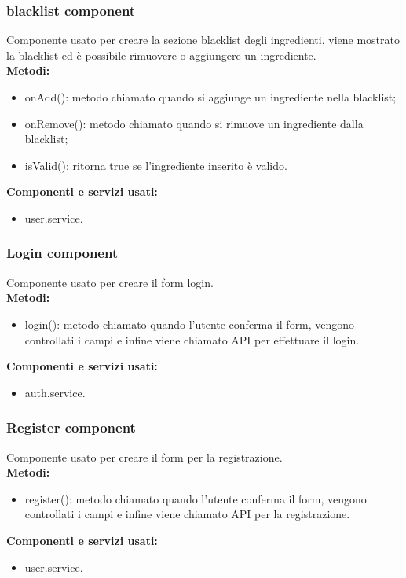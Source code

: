 \subsubsection{blacklist component}
Componente usato per creare la sezione blacklist degli ingredienti, viene mostrato la blacklist ed è possibile rimuovere o aggiungere un ingrediente.\\
\textbf{Metodi:}
\begin{itemize}
    \item onAdd(): metodo chiamato quando si aggiunge un ingrediente nella blacklist;
    \item onRemove(): metodo chiamato quando si rimuove un ingrediente dalla blacklist;
    \item isValid(): ritorna true se l'ingrediente inserito è valido.
\end{itemize}
\textbf{Componenti e servizi usati:}
\begin{itemize}
    \item user.service.
\end{itemize}

\subsubsection{Login component}
Componente usato per creare il form login.\\
\textbf{Metodi:}
\begin{itemize}
    \item login(): metodo chiamato quando l'utente conferma il form, vengono controllati i campi e infine viene chiamato API per effettuare il login.
\end{itemize}
\textbf{Componenti e servizi usati:}
\begin{itemize}
    \item auth.service.
\end{itemize}

\subsubsection{Register component}
Componente usato per creare il form per la registrazione.\\
\textbf{Metodi:}
\begin{itemize}
    \item register(): metodo chiamato quando l'utente conferma il form, vengono controllati i campi e infine viene chiamato API per la registrazione.
\end{itemize}
\textbf{Componenti e servizi usati:}
\begin{itemize}
    \item user.service.
\end{itemize}

